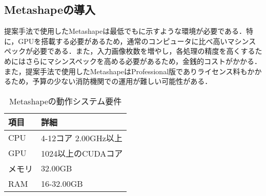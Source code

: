     \subsection*{Metashapeの導入}
      提案手法で使用したMetashapeは最低でもに示すような環境が必要である．特に，GPUを搭載する必要があるため，通常のコンピュータに比べ高いマシンスペックが必要である．また，入力画像枚数を増やし，各処理の精度を高くするためにはさらにマシンスペックを高める必要があるため，金銭的コストがかかる．また，提案手法で使用したMetashapeはProfessional版でありライセンス料もかかるため，予算の少ない消防機関での運用が難しい可能性がある．
      
      \begin{table}[t]
        \centering
        \caption{Metashapeの動作システム要件}
        \label{Metashapeの動作システム要件1}
        \begin{tabular}{ll}
          \hline
          \textbf{項目} & \textbf{詳細} \\
          \hline \hline
          CPU & 4-12コア 2.00GHz以上 \\
          GPU & 1024以上のCUDAコア \\
          メモリ & 32.00GB \\
          RAM & 16-32.00GB \\ \hline
        \end{tabular}
      \end{table}
